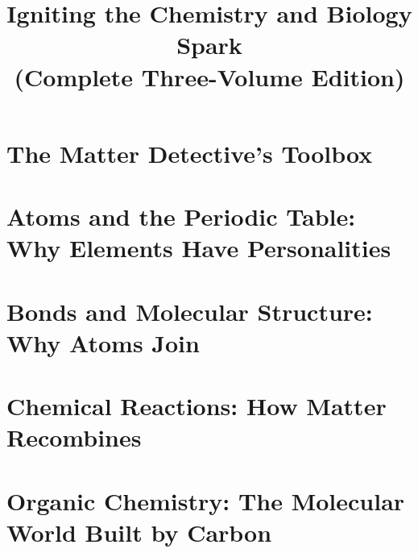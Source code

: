 \documentclass[12pt,openany,fontset=none,UTF8,scheme=chinese]{ctexbook}
\title{Igniting the Chemistry and Biology Spark\\(Complete Three-Volume Edition)}
\author{}
\date{}
\begin{document}
\frontmatter
\maketitle



\makeatletter
\renewcommand{\@pnumwidth}{2.2em}
\renewcommand{\@tocrmarg}{3.2em}
\makeatother
\tableofcontents

\mainmatter

\part{The Matter Detective's Toolbox}






\part{Atoms and the Periodic Table: Why Elements Have Personalities}












\part{Bonds and Molecular Structure: Why Atoms Join}










\part{Chemical Reactions: How Matter Recombines}













\part{Organic Chemistry: The Molecular World Built by Carbon}









\end{document}
